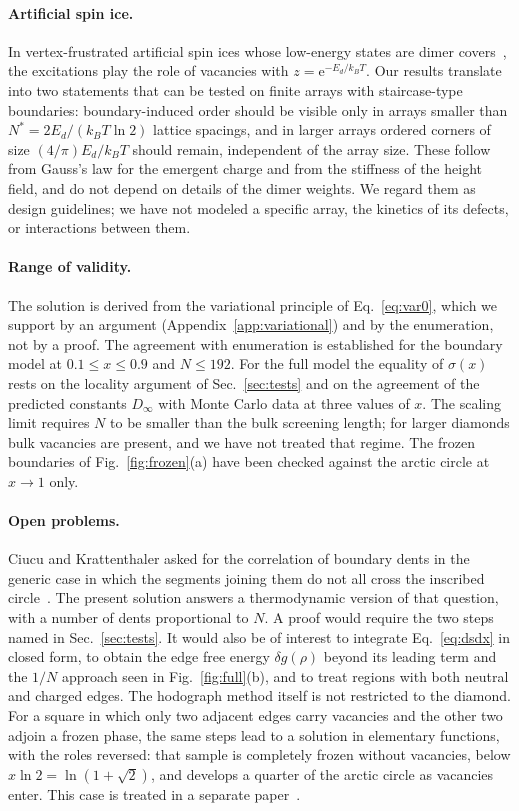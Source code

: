 \documentclass[reprint,aps,pre,superscriptaddress,longbibliography,floatfix,amsmath,amssymb]{revtex4-2}
\newcommand{\Nst}{N^{*}}                 %
\newcommand{\sig}{\sigma}                %
\newcommand{\ee}{\mathrm{e}}
\begin{document}
\paragraph*{Artificial spin ice.} In vertex-frustrated artificial spin ices whose low-energy states are dimer covers~\cite{lao2018}, the excitations play the role of vacancies with $z=\ee^{-E_d/k_BT}$. Our results translate into two statements that can be tested on finite arrays with staircase-type boundaries: boundary-induced order should be visible only in arrays smaller than $\Nst=2E_d/(k_BT\ln2)$ lattice spacings, and in larger arrays ordered corners of size $(4/\pi)E_d/k_BT$ should remain, independent of the array size. These follow from Gauss's law for the emergent charge and from the stiffness of the height field, and do not depend on details of the dimer weights. We regard them as design guidelines; we have not modeled a specific array, the kinetics of its defects, or interactions between them.

\paragraph*{Range of validity.} The solution is derived from the variational principle of Eq.~\eqref{eq:var0}, which we support by an argument (Appendix~\ref{app:variational}) and by the enumeration, not by a proof. The agreement with enumeration is established for the boundary model at $0.1\le x\le0.9$ and $N\le192$. For the full model the equality of $\sig(x)$ rests on the locality argument of Sec.~\ref{sec:tests} and on the agreement of the predicted constants $D_\infty$ with Monte Carlo data at three values of $x$. The scaling limit requires $N$ to be smaller than the bulk screening length; for larger diamonds bulk vacancies are present, and we have not treated that regime. The frozen boundaries of Fig.~\ref{fig:frozen}(a) have been checked against the arctic circle at $x\to1$ only.

\paragraph*{Open problems.} Ciucu and Krattenthaler asked for the correlation of boundary dents in the generic case in which the segments joining them do not all cross the inscribed circle~\cite{ciucu2023}. The present solution answers a thermodynamic version of that question, with a number of dents proportional to $N$. A proof would require the two steps named in Sec.~\ref{sec:tests}. It would also be of interest to integrate Eq.~\eqref{eq:dsdx} in closed form, to obtain the edge free energy $\delta g(\rho)$ beyond its leading term and the $1/N$ approach seen in Fig.~\ref{fig:full}(b), and to treat regions with both neutral and charged edges. The hodograph method itself is not restricted to the diamond. For a square in which only two adjacent edges carry vacancies and the other two adjoin a frozen phase, the same steps lead to a solution in elementary functions, with the roles reversed: that sample is completely frozen without vacancies, below $x\ln2=\ln(1+\sqrt2)$, and develops a quarter of the arctic circle as vacancies enter. This case is treated in a separate paper~\cite{TODO-won-design}.
\end{document}
